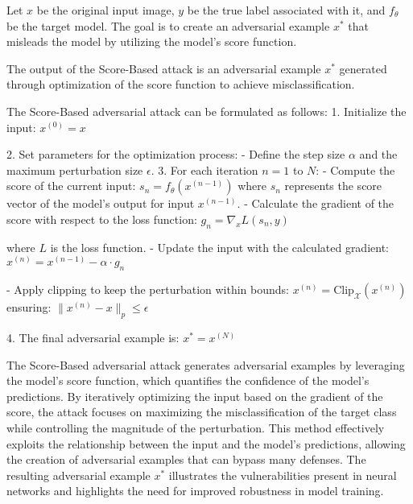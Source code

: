 Let $x$ be the original input image, $y$ be the true label associated with it, and $f_{\theta}$ be the target model. The goal is to create an adversarial example $x^*$ that misleads the model by utilizing the model's score function.

The output of the Score-Based attack is an adversarial example $x^*$ generated through optimization of the score function to achieve misclassification.

The Score-Based adversarial attack can be formulated as follows:
1. Initialize the input:
   $x^{(0)} = x$
   
2. Set parameters for the optimization process:
   - Define the step size $\alpha$ and the maximum perturbation size $\epsilon$.
3. For each iteration $n = 1$ to $N$:
   - Compute the score of the current input:
   $s_n = f_{\theta}(x^{(n-1)})$
   where $s_n$ represents the score vector of the model's output for input $x^{(n-1)}$.
   - Calculate the gradient of the score with respect to the loss function:
   $g_n = \nabla_x L(s_n, y)$
   
   where $L$ is the loss function.
   - Update the input with the calculated gradient:
   $x^{(n)} = x^{(n-1)} - \alpha \cdot g_n$
   
   - Apply clipping to keep the perturbation within bounds:
   $x^{(n)} = \text{Clip}_{\mathcal{X}}(x^{(n)})$
   ensuring:
   $\|x^{(n)} - x\|_p \leq \epsilon$

4. The final adversarial example is:
   $x^* = x^{(N)}$

The Score-Based adversarial attack generates adversarial examples by leveraging the model's score function, which quantifies the confidence of the model's predictions. By iteratively optimizing the input based on the gradient of the score, the attack focuses on maximizing the misclassification of the target class while controlling the magnitude of the perturbation. This method effectively exploits the relationship between the input and the model's predictions, allowing the creation of adversarial examples that can bypass many defenses. The resulting adversarial example $x^*$ illustrates the vulnerabilities present in neural networks and highlights the need for improved robustness in model training.
